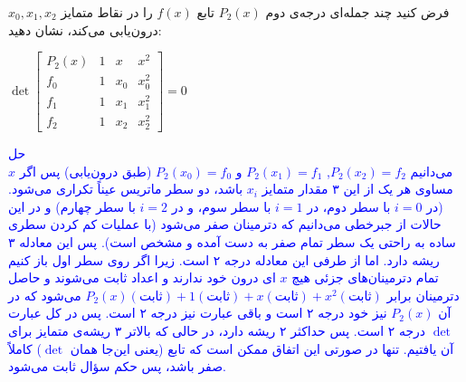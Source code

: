 فرض کنید چند جمله‌ای درجه‌ی دوم 
$P_2(x)$
 تابع 
 $f(x)$
 را در نقاط متمایز 
 $x_0,x_1,x_2$
 درون‌یابی می‌کند، نشان دهید:
 
 \begin{center}
 	$\det \begin{bmatrix}
 		P_2(x) & 1 & x & x^2\\
 		f_0 & 1 & x_0 & x_0^2 \\ 
 		f_1 & 1 & x_1 & x_1^2 \\
 		f_2 & 1 & x_2 & x_2^2
 	\end{bmatrix} = 0$
 \end{center}
\textcolor{blue}{حل
\\
می‌دانیم
$P_2(x_2) = f_2$,
$P_2(x_1) = f_1$
و
$P_2(x_0) = f_0$
(طبق درون‌یابی)
پس اگر 
$x$
مساوی هر یک از این ۳ مقدار متمایز 
$x_i$
باشد، دو سطر ماتریس عیناً تکراری می‌شود. 
(در 
$i = 0$
با سطر دوم، در 
$i = 1$
با سطر سوم،
و در 
$i = 2$
با سطر چهارم)
و در این حالات از جبرخطی می‌دانیم که دترمینان صفر می‌شود (با عملیات کم کردن سطری ساده به راحتی یک سطر تمام صفر به دست آمده و مشخص است). پس این معادله ۳ ریشه دارد. اما از طرفی این معادله درجه ۲ است. زیرا اگر روی سطر اول باز کنیم تمام دترمینان‌های جزئی هیچ 
$x$
ای درون خود ندارند و اعداد ثابت می‌شوند و حاصل دترمینان برابر 
$P_2(x)(\text{ثابت}) + 1 (\text{ثابت}) + x(\text{ثابت}) + x^2 (\text{ثابت})$
می‌شود که در آن 
$P_2(x)$
نیز خود درجه ۲ است و باقی عبارت نیز درجه ۲ است. پس در کل عبارت
$\det$
درجه ۲ است. پس حداکثر ۲ ریشه دارد، در حالی که بالاتر ۳ ریشه‌ی متمایز برای آن یافتیم. تنها در صورتی این اتفاق ممکن است که تابع
(یعنی این‌جا همان
$\det$)
کاملاً صفر باشد، پس حکم سؤال ثابت می‌شود.
}